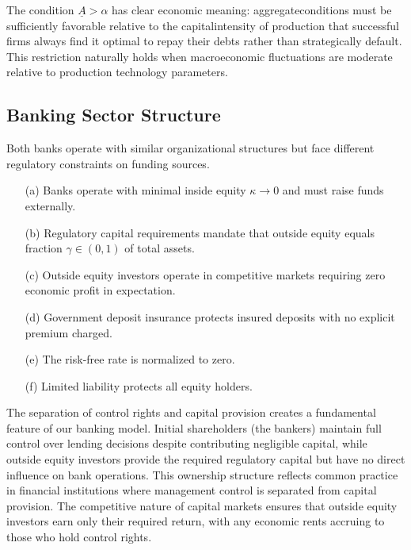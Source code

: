 \documentclass[12pt]{article}
\begin{document}
\begin{remark}
The condition $\underline{A} > \alpha$ has clear economic meaning: aggregate\Allow conditions must be sufficiently favorable relative to the capital\Allow intensity of production that successful firms always find it optimal to repay their debts rather than strategically default. This restriction naturally holds when macroeconomic fluctuations are moderate relative to production technology parameters.
\end{remark}

\subsection{Banking Sector Structure}
Both banks operate with similar organizational structures but face different regulatory constraints on funding sources.

\begin{assumption}
\begin{enumerate}
    \item[(a)] Banks operate with minimal inside equity $\kappa \to 0$ and must raise funds externally.
    \item[(b)] Regulatory capital requirements mandate that outside equity equals fraction $\gamma \in (0,1)$ of total assets.
    \item[(c)] Outside equity investors operate in competitive markets requiring zero economic profit in expectation.
    \item[(d)] Government deposit insurance protects insured deposits with no explicit premium charged.
    \item[(e)] The risk-free rate is normalized to zero.
    \item[(f)] Limited liability protects all equity holders.
\end{enumerate}
\end{assumption}

The separation of control rights and capital provision creates a fundamental feature of our banking model. Initial shareholders (the bankers) maintain full control over lending decisions despite contributing negligible capital, while outside equity investors provide the required regulatory capital but have no direct influence on bank operations. This ownership structure reflects common practice in financial institutions where management control is separated from capital provision. The competitive nature of capital markets ensures that outside equity investors earn only their required return, with any economic rents accruing to those who hold control rights.
\end{document}
